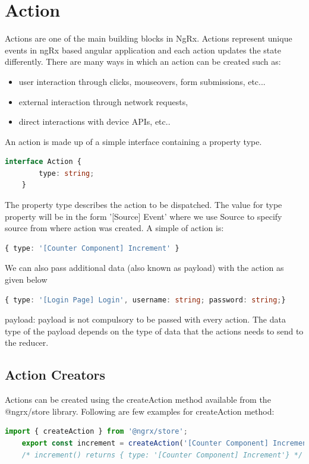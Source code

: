 \documentclass{report}
\begin{document}
\section{Action}
Actions are one of the main building blocks in NgRx. Actions represent unique events in ngRx based angular application and each action updates the state differently. There are many ways in which an action can be created such as:
\begin{itemize}
	\item{user interaction through clicks, mouseovers, form submissions, etc...}
	\item{external interaction through network requests,}
	\item{direct interactions with device APIs, etc..}
\end{itemize}
An action is made up of a simple interface containing a property type.

\begin{lstlisting}[caption=action.ts, language=Typescript]
	interface Action {
		type: string;
	}
\end{lstlisting}
The property type describes the action to be dispatched. The value for type property will be in the form '[Source] Event' where we use Source to specify source from where action was created. A simple of action is:


\begin{lstlisting}[caption=example-action, language=Typescript]
	{ type: '[Counter Component] Increment' }
\end{lstlisting}

We can also pass additional data (also known as payload) with the action as given below

\begin{lstlisting}[caption=example-action, language=Typescript]
	{ type: '[Login Page] Login', username: string; password: string;}
\end{lstlisting}

payload: payload is not compulsory to be passed with every action. The data type of the payload depends on the type of data that the actions needs to send to the reducer.

\subsection{Action Creators}
Actions can be created using the createAction method available from the @ngrx/store library. Following are few examples for createAction method:
\begin{lstlisting}[caption=without payload, language=Typescript]
	import { createAction } from '@ngrx/store';
	export const increment = createAction('[Counter Component] Increment');
	/* increment() returns { type: '[Counter Component] Increment'} */

\end{lstlisting}
\end{document}
